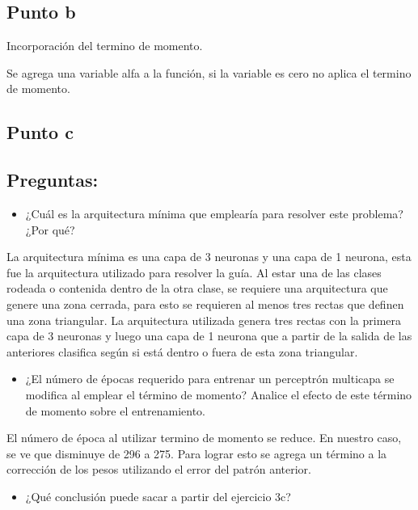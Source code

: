 \documentclass[]{book}
\providecommand{\tightlist}{%
  \setlength{\itemsep}{0pt}\setlength{\parskip}{0pt}}
\begin{document}
\hypertarget{punto-b-1}{%
\subsection{Punto b}\label{punto-b-1}}

Incorporación del termino de momento.

Se agrega una variable alfa a la función, si la variable es cero no aplica el termino de momento.

\hypertarget{punto-c}{%
\subsection{Punto c}\label{punto-c}}

\hypertarget{preguntas-2}{%
\subsection{Preguntas:}\label{preguntas-2}}

\begin{itemize}
\tightlist
\item
  ¿Cuál es la arquitectura mínima que emplearía para resolver este problema? ¿Por qué?
\end{itemize}

La arquitectura mínima es una capa de 3 neuronas y una capa de 1 neurona, esta fue la arquitectura utilizado para resolver la guía. Al estar una de las clases rodeada o contenida dentro de la otra clase, se requiere una arquitectura que genere una zona cerrada, para esto se requieren al menos tres rectas que definen una zona triangular. La arquitectura utilizada genera tres rectas con la primera capa de 3 neuronas y luego una capa de 1 neurona que a partir de la salida de las anteriores clasifica según si está dentro o fuera de esta zona triangular.

\begin{itemize}
\tightlist
\item
  ¿El número de épocas requerido para entrenar un perceptrón multicapa se modifica al emplear el término de momento? Analice el efecto de este término de momento sobre el entrenamiento.
\end{itemize}

El número de época al utilizar termino de momento se reduce. En nuestro caso, se ve que disminuye de 296 a 275. Para lograr esto se agrega un término a la corrección de los pesos utilizando el error del patrón anterior.

\begin{itemize}
\tightlist
\item
  ¿Qué conclusión puede sacar a partir del ejercicio 3c?
\end{itemize}
\end{document}
